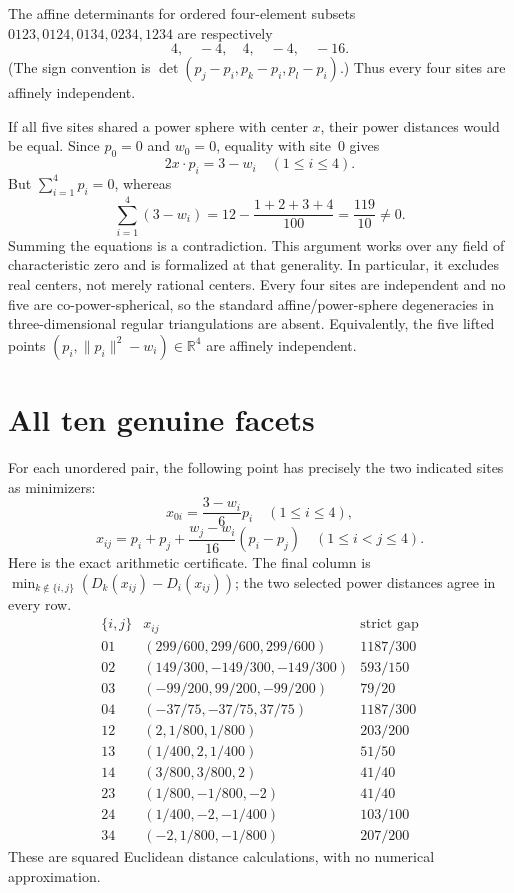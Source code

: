 \documentclass[11pt]{article}
\begin{document}
The affine determinants for ordered four-element subsets $0123,0124,0134,0234,1234$ are respectively
\[
4,\quad -4,\quad 4,\quad -4,\quad -16.
\]
(The sign convention is $\det(p_j-p_i,p_k-p_i,p_l-p_i)$.) Thus every four sites are affinely independent.

If all five sites shared a power sphere with center $x$, their power distances would be equal. Since $p_0=0$ and $w_0=0$, equality with site~0 gives
\[
2x\cdot p_i=3-w_i\quad(1\le i\le4).
\]
But $\sum_{i=1}^4p_i=0$, whereas
\[
\sum_{i=1}^4(3-w_i)=12-\frac{1+2+3+4}{100}=\frac{119}{10}\ne0.
\]
Summing the equations is a contradiction. This argument works over any field of characteristic zero and is formalized at that generality. In particular, it excludes real centers, not merely rational centers. Every four sites are independent and no five are co-power-spherical, so the standard affine/power-sphere degeneracies in three-dimensional regular triangulations are absent. Equivalently, the five lifted points $(p_i,\|p_i\|^2-w_i)\in\mathbb R^4$ are affinely independent.

\section{All ten genuine facets}
For each unordered pair, the following point has precisely the two indicated sites as minimizers:
\[
x_{0i}=\frac{3-w_i}{6}p_i\quad(1\le i\le4),
\]
\[
x_{ij}=p_i+p_j+\frac{w_j-w_i}{16}(p_i-p_j)
\quad(1\le i<j\le4).
\]
Here is the exact arithmetic certificate. The final column is
$\min_{k\notin\{i,j\}}(D_k(x_{ij})-D_i(x_{ij}))$; the two selected power distances agree in every row.
\[
\begin{array}{c|c|c}
\{i,j\}&x_{ij}&\text{strict gap}\\\hline
01&(299/600,299/600,299/600)&1187/300\\
02&(149/300,-149/300,-149/300)&593/150\\
03&(-99/200,99/200,-99/200)&79/20\\
04&(-37/75,-37/75,37/75)&1187/300\\
12&(2,1/800,1/800)&203/200\\
13&(1/400,2,1/400)&51/50\\
14&(3/800,3/800,2)&41/40\\
23&(1/800,-1/800,-2)&41/40\\
24&(1/400,-2,-1/400)&103/100\\
34&(-2,1/800,-1/800)&207/200
\end{array}
\]
These are squared Euclidean distance calculations, with no numerical approximation.
\end{document}
